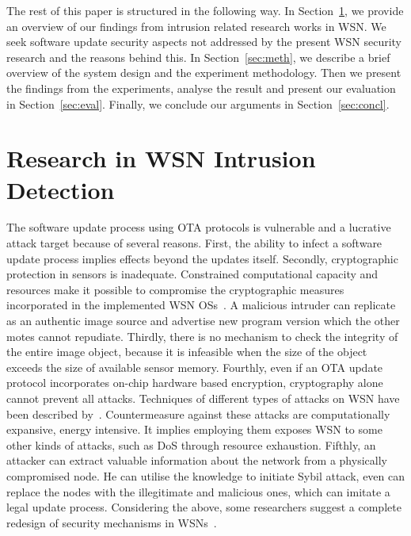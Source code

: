 \documentclass[conference,manuscript]{IEEEtran}
\begin{document}
The rest of this paper is structured in the following way. 
In Section~\ref{sec:lit},  
we provide an overview of our findings from
intrusion related research works in WSN. We seek software
update security aspects not addressed by the present WSN
security research and the reasons behind this.  
In Section~\ref{sec:meth}, we describe a brief overview of the system design and the experiment methodology. Then we present the findings from the
experiments, analyse the result and present our evaluation in
Section~\ref{sec:eval}.  
Finally, we conclude our arguments in Section~\ref{sec:concl}.

\section{Research in WSN Intrusion Detection}
\label{sec:lit}


The software update process using OTA protocols is vulnerable
and a lucrative attack target because of several reasons. First,
the ability to infect a software update process implies effects
beyond the updates itself. Secondly, cryptographic protection in
sensors is inadequate. Constrained computational capacity and
resources make it possible to compromise the cryptographic
measures incorporated in the implemented WSN OSs~\cite{aes2011}.
A  malicious intruder can replicate as an authentic
image source and advertise new program version which the
other motes cannot repudiate.
Thirdly, there is no mechanism to check the integrity of the entire
image object, because it is infeasible when the size of the object exceeds
the size of available sensor memory.
Fourthly, even if an OTA update protocol incorporates on-chip hardware based encryption,
cryptography alone cannot prevent all attacks. 
Techniques of
different types of attacks on WSN have been described by~\cite{DBLP:journals/corr/abs-1301-3022}. Countermeasure against these attacks are computationally
expansive, energy intensive. It implies employing them exposes
WSN to some other kinds of attacks, such as DoS through
resource exhaustion. 
Fifthly, an attacker can extract valuable
information about the network from a physically compromised
node. He can utilise the knowledge to initiate Sybil attack, even
can replace the nodes with the illegitimate and malicious ones,
which can imitate a legal update process. Considering the above, some researchers suggest a complete redesign
of security mechanisms in WSNs~\cite{quing09}.
\end{document}
